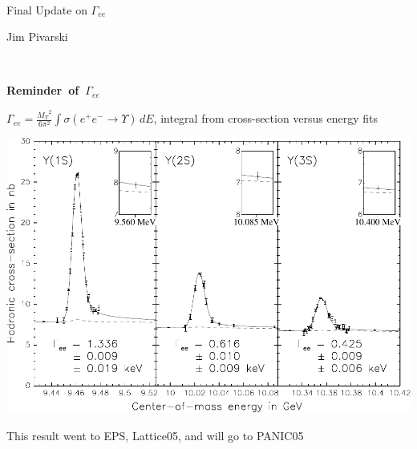 \documentclass[landscape]{article}
\newenvironment{slide}[1][ ]{\mbox{\boldmath \bf #1 } \vfill}{\vfill \mbox{ } \pagebreak}
\begin{document}
\huge \sf
\renewcommand{\labelitemi}{{\LARGE $\stackrel{\bullet}{\mbox{ }}$}}
\setlength{\parindent}{0 cm}

\begin{slide}

\begin{center}
  \Huge Final Update on \boldmath $\Gamma_{ee}$

  \vspace{1 cm}
  Jim Pivarski
\end{center}

\end{slide}

\begin{slide}[Reminder of $\Gamma_{ee}$]

$\Gamma_{ee} = \displaystyle \frac{{M_\Upsilon}^2}{6\pi^2} \int \sigma(e^+e^- \to
\Upsilon) \, dE$, integral from cross-section versus energy fits

\vfill
\begin{center}
  \includegraphics[width=0.8\linewidth]{../panic05/xfiged_three_resonances_inset_squat2}
\end{center}

\vfill
This result went to EPS, Lattice05, and will go to PANIC05

\vspace{-1 cm}

\end{slide}
\end{document}
